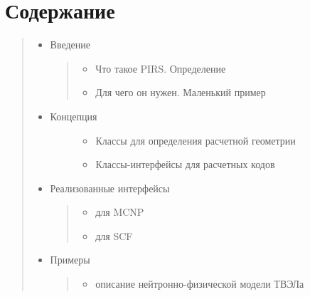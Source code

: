 \documentclass[a4paper]{article}
\begin{document}
\section{Содержание%
  \label{id1}%
}
%
\begin{quote}
%
\begin{itemize}

\item Введение
%
\begin{quote}
%
\begin{itemize}

\item Что такое PIRS. Определение

\item Для чего он нужен. Маленький пример

\end{itemize}

\end{quote}

\item %
\begin{description}
\item[{Концепция}] \leavevmode %
\begin{itemize}

\item Классы для определения расчетной геометрии

\item Классы-интерфейсы для расчетных кодов

\end{itemize}

\end{description}

\item Реализованные интерфейсы
%
\begin{quote}
%
\begin{itemize}

\item для MCNP

\item для SCF

\end{itemize}

\end{quote}

\item Примеры
%
\begin{quote}
%
\begin{itemize}

\item описание нейтронно-физической модели ТВЭЛа


\end{itemize}
\end{quote}
\end{itemize}
\end{quote}
\end{document}
